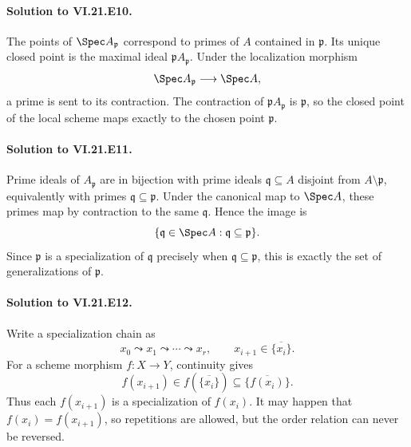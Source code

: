 \paragraph{Solution to VI.21.E10.}
\begin{solution}
The points of $\Spec A_{\mathfrak p}$ correspond to primes of $A$ contained in
$\mathfrak p$.  Its unique closed point is the maximal ideal
$\mathfrak pA_{\mathfrak p}$.  Under the localization morphism
\[
\Spec A_{\mathfrak p}\longrightarrow\Spec A,
\]
a prime is sent to its contraction.  The contraction of $\mathfrak pA_{\mathfrak p}$ is
$\mathfrak p$, so the closed point of the local scheme maps exactly to the chosen point
$\mathfrak p$.
\end{solution}

\paragraph{Solution to VI.21.E11.}
\begin{solution}
Prime ideals of $A_{\mathfrak p}$ are in bijection with prime ideals
$\mathfrak q\subseteq A$ disjoint from $A\setminus\mathfrak p$, equivalently with primes
$\mathfrak q\subseteq\mathfrak p$.  Under the canonical map to $\Spec A$, these primes map by
contraction to the same $\mathfrak q$.  Hence the image is
\[
\{\mathfrak q\in\Spec A:\mathfrak q\subseteq\mathfrak p\}.
\]
Since $\mathfrak p$ is a specialization of $\mathfrak q$ precisely when
$\mathfrak q\subseteq\mathfrak p$, this is exactly the set of generalizations of
$\mathfrak p$.
\end{solution}

\paragraph{Solution to VI.21.E12.}
\begin{solution}
Write a specialization chain as
\[
x_0\leadsto x_1\leadsto\cdots\leadsto x_r,
\qquad x_{i+1}\in\overline{\{x_i\}}.
\]
For a scheme morphism $f:X\to Y$, continuity gives
\[
f(x_{i+1})\in f(\overline{\{x_i\}})\subseteq
\overline{\{f(x_i)\}}.
\]
Thus each $f(x_{i+1})$ is a specialization of $f(x_i)$.  It may happen that
$f(x_i)=f(x_{i+1})$, so repetitions are allowed, but the order relation can never be reversed.
\end{solution}

